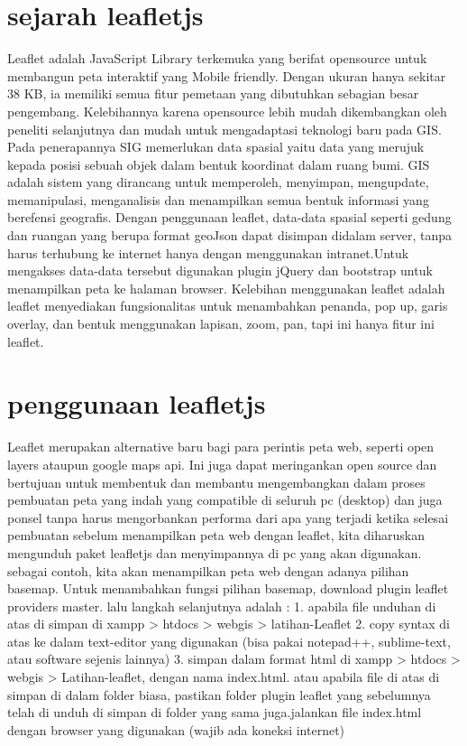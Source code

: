  
 
 
 \section{sejarah leafletjs}
        Leaflet adalah JavaScript Library terkemuka yang berifat opensource untuk membangun peta interaktif yang Mobile friendly. Dengan ukuran hanya sekitar 38 KB, ia memiliki semua fitur pemetaan yang dibutuhkan sebagian besar pengembang.
    Kelebihannya karena opensource lebih mudah dikembangkan oleh peneliti selanjutnya dan mudah untuk mengadaptasi teknologi baru pada GIS. Pada penerapannya SIG memerlukan data spasial yaitu data yang merujuk kepada posisi sebuah objek dalam bentuk koordinat dalam ruang bumi. GIS adalah sistem yang dirancang untuk memperoleh, menyimpan, mengupdate, memanipulasi, menganalisis dan menampilkan semua bentuk informasi yang berefensi geografis.
Dengan penggunaan leaflet, data-data spasial seperti gedung dan ruangan yang berupa format geoJson dapat disimpan didalam server, tanpa harus terhubung ke internet hanya dengan menggunakan intranet.Untuk mengakses data-data tersebut digunakan plugin jQuery dan bootstrap untuk menampilkan peta ke halaman browser. Kelebihan menggunakan leaflet adalah leaflet menyediakan fungsionalitas untuk menambahkan penanda, pop up, garis overlay, dan bentuk menggunakan lapisan, zoom, pan, tapi ini hanya fitur ini leaflet.

\section{penggunaan leafletjs}
Leaflet merupakan alternative baru bagi para perintis peta web, seperti open layers ataupun google maps api. Ini juga dapat meringankan open source dan bertujuan untuk membentuk dan membantu mengembangkan dalam proses pembuatan peta yang indah yang compatible di seluruh pc (desktop) dan juga ponsel tanpa harus mengorbankan performa dari apa yang terjadi ketika selesai pembuatan
sebelum menampilkan peta web dengan leaflet, kita diharuskan mengunduh paket leafletjs dan menyimpannya di pc yang akan digunakan. 
sebagai contoh, kita akan menampilkan peta web dengan adanya pilihan basemap. Untuk menambahkan fungsi pilihan basemap, download plugin leaflet providers master. lalu langkah selanjutnya adalah :
1. apabila file unduhan di atas di simpan di xampp > htdocs > webgis > latihan-Leaflet
2. copy syntax di atas ke dalam text-editor yang digunakan (bisa pakai notepad++, sublime-text, atau software sejenis lainnya)
3. simpan dalam format html di xampp > htdocs > webgis > Latihan-leaflet, dengan nama index.html. atau apabila file di atas di simpan di      dalam folder biasa, pastikan folder plugin leaflet yang sebelumnya telah di unduh di simpan di folder yang sama juga.jalankan file          index.html dengan browser yang digunakan (wajib ada koneksi internet)


